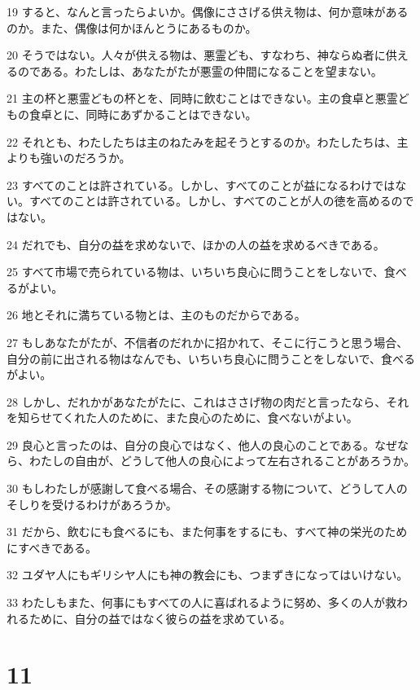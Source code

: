 \par 19 すると、なんと言ったらよいか。偶像にささげる供え物は、何か意味があるのか。また、偶像は何かほんとうにあるものか。
\par 20 そうではない。人々が供える物は、悪霊ども、すなわち、神ならぬ者に供えるのである。わたしは、あなたがたが悪霊の仲間になることを望まない。
\par 21 主の杯と悪霊どもの杯とを、同時に飲むことはできない。主の食卓と悪霊どもの食卓とに、同時にあずかることはできない。
\par 22 それとも、わたしたちは主のねたみを起そうとするのか。わたしたちは、主よりも強いのだろうか。
\par 23 すべてのことは許されている。しかし、すべてのことが益になるわけではない。すべてのことは許されている。しかし、すべてのことが人の徳を高めるのではない。
\par 24 だれでも、自分の益を求めないで、ほかの人の益を求めるべきである。
\par 25 すべて市場で売られている物は、いちいち良心に問うことをしないで、食べるがよい。
\par 26 地とそれに満ちている物とは、主のものだからである。
\par 27 もしあなたがたが、不信者のだれかに招かれて、そこに行こうと思う場合、自分の前に出される物はなんでも、いちいち良心に問うことをしないで、食べるがよい。
\par 28 しかし、だれかがあなたがたに、これはささげ物の肉だと言ったなら、それを知らせてくれた人のために、また良心のために、食べないがよい。
\par 29 良心と言ったのは、自分の良心ではなく、他人の良心のことである。なぜなら、わたしの自由が、どうして他人の良心によって左右されることがあろうか。
\par 30 もしわたしが感謝して食べる場合、その感謝する物について、どうして人のそしりを受けるわけがあろうか。
\par 31 だから、飲むにも食べるにも、また何事をするにも、すべて神の栄光のためにすべきである。
\par 32 ユダヤ人にもギリシヤ人にも神の教会にも、つまずきになってはいけない。
\par 33 わたしもまた、何事にもすべての人に喜ばれるように努め、多くの人が救われるために、自分の益ではなく彼らの益を求めている。

\chapter{11}

